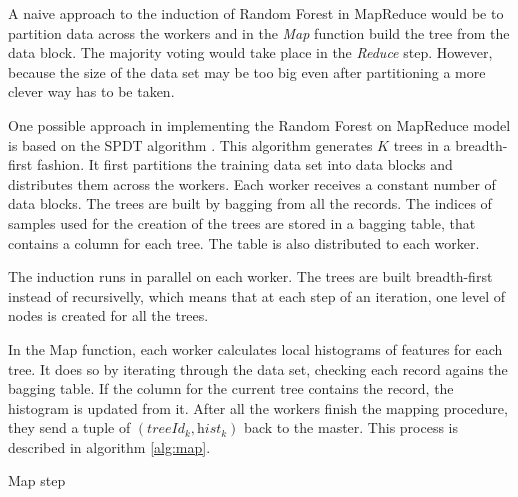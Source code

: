 \documentclass[thesis=B,english]{FITthesis}[2012/10/20]
\begin{document}
	A naive approach to the induction of Random Forest in MapReduce would be to partition data across the workers and in the \emph{Map} function build the tree from the data block. The majority voting would take place in the \emph{Reduce} step. However, because the size of the data set may be too big even after partitioning a more clever way has to be taken.
	
	One possible approach \cite{SCALABLE_RDF} in implementing the Random Forest on MapReduce model is based on the SPDT algorithm \cite{ben2010streaming}. This algorithm generates \(K\) trees in a breadth-first fashion. It first partitions the training data set into data blocks and distributes them across the workers. Each worker receives a constant number of data blocks. The trees are built by bagging from all the records. The indices of samples used for the creation of the trees are stored in a bagging table, that contains a column for each tree. The table is also distributed to each worker.

	The induction runs in parallel on each worker. The trees are built breadth-first instead of recursivelly, which means that at each step of an iteration, one level of nodes is created for all the trees. 

	In the Map function, each worker calculates local histograms of features for each tree. It does so by iterating through the data set, checking each record agains the bagging table. If the column for the current tree contains the record, the histogram is updated from it. After all the workers finish the mapping procedure, they send a tuple of \((\textit{treeId}_k, \textit{hist}_k)\) back to the master. This process is described in algorithm \ref{alg:map}.

	\begin{algorithm}[H]
	\caption{Map step}
	\label{alg:map}
	\end{algorithm} 
\end{document}
